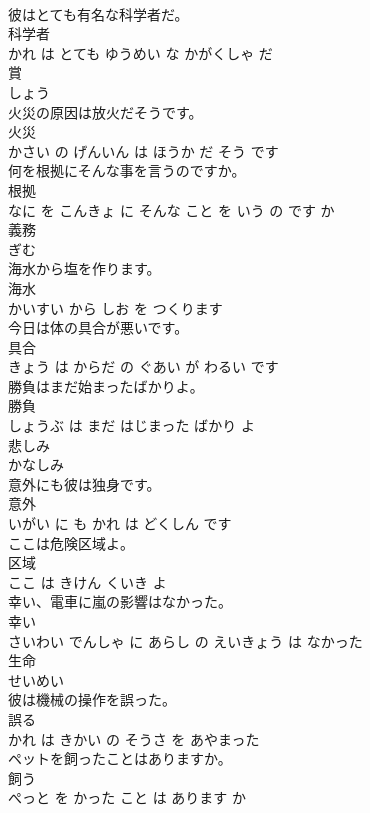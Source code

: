 \documentclass[8pt]{extreport}
\begin{document}
\begin{CJK}{UTF8}{min}
\\	彼はとても有名な科学者だ。	
\\	科学者 
\\	かれ は とても ゆうめい な かがくしゃ だ			
\\	賞	
\\	しょう			
\\	火災の原因は放火だそうです。	
\\	火災 
\\	かさい の げんいん は ほうか だ そう です			
\\	何を根拠にそんな事を言うのですか。	
\\	根拠 
\\	なに を こんきょ に そんな こと を いう の です か			
\\	義務	
\\	ぎむ			
\\	海水から塩を作ります。	
\\	海水 
\\	かいすい から しお を つくります			
\\	今日は体の具合が悪いです。	
\\	具合 
\\	きょう は からだ の ぐあい が わるい です			
\\	勝負はまだ始まったばかりよ。	
\\	勝負 
\\	しょうぶ は まだ はじまった ばかり よ			
\\	悲しみ	
\\	かなしみ			
\\	意外にも彼は独身です。	
\\	意外 
\\	いがい に も かれ は どくしん です			
\\	ここは危険区域よ。	
\\	区域 
\\	ここ は きけん くいき よ			
\\	幸い、電車に嵐の影響はなかった。	
\\	幸い 
\\	さいわい でんしゃ に あらし の えいきょう は なかった			
\\	生命	
\\	せいめい			
\\	彼は機械の操作を誤った。	
\\	誤る 
\\	かれ は きかい の そうさ を あやまった			
\\	ペットを飼ったことはありますか。	
\\	飼う 
\\	ぺっと を かった こと は あります か			

\end{CJK}
\end{document}
